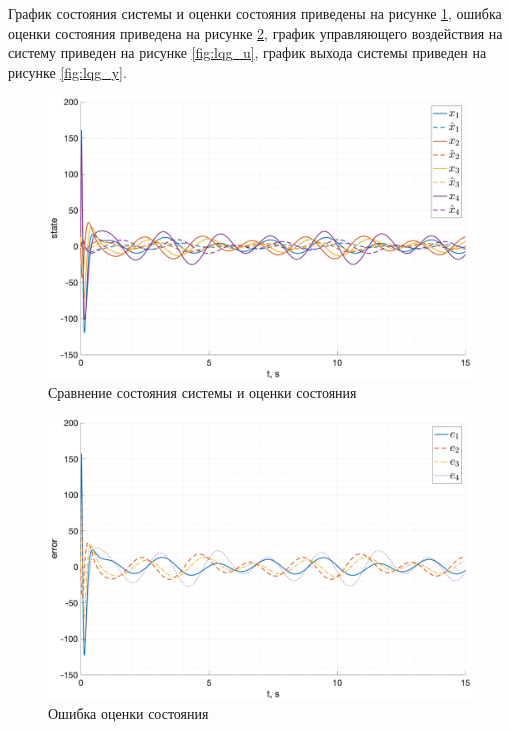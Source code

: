 График состояния системы и оценки состояния приведены на рисунке \ref{fig:lqg_state_cmp}, 
ошибка оценки состояния приведена на рисунке \ref{fig:lqg_state_err},
график управляющего воздействия на систему приведен на рисунке \ref{fig:lqg_u}, 
график выхода системы приведен на рисунке \ref{fig:lqg_y}.
\begin{figure}[ht!]
    \centering
    \includegraphics[width=\textwidth]{media/plots/lqr_task3/state_cmp_1.png}
    \caption{Сравнение состояния системы и оценки состояния}
    \label{fig:lqg_state_cmp}
\end{figure}
\begin{figure}[ht!]
    \centering
    \includegraphics[width=\textwidth]{media/plots/lqr_task3/err_1.png}
    \caption{Ошибка оценки состояния}
    \label{fig:lqg_state_err}
\end{figure}

